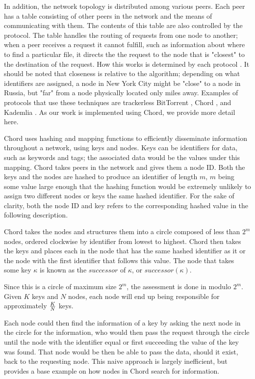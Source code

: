\documentclass[10pt, conference, compsocconf, letterpaper]{IEEEtran} %
\begin{document}
In addition, the network topology is distributed among various peers.  Each peer has a table consisting of other peers in the network and the means of communicating with them.  The contents of this table are also controlled by the protocol.  The table handles the routing of requests from one node to another; when a peer receives a request it cannot fulfill, such as information about where to find a particular file, it directs the the request to the node that is "closest" to the destination of the request. How this works is determined by each protocol \cite{Chord}.  It should be noted that closeness is relative to the algorithm; depending on what identifiers are assigned, a node in New York City might be "close" to a node in Russia, but "far" from a node physically located only miles away.  Examples of protocols that use these techniques are trackerless BitTorrent \cite{BitTorrent}, Chord \cite{Chord}, and Kademlia \cite{Kademlia}. As our work is implemented using Chord, we provide more detail here. 

Chord uses hashing and mapping functions to efficiently disseminate information throughout a network, using keys and nodes.  Keys can be identifiers for data, such as keywords and tags; the associated data would be the values under this mapping.  Chord takes peers in the network and gives them a node ID.  Both the keys and the nodes are hashed to produce an identifier of length $m$, $m$ being some value large enough that the hashing function would be extremely unlikely to assign two different nodes or keys the same hashed identifier.  For the sake of clarity, both the node ID and key refers to the corresponding hashed value in the following description.

Chord takes the nodes and structures them into a circle composed of less than $2^m$ nodes, ordered clockwise by identifier from lowest to highest.  Chord then takes the keys and places each in the node that has the same hashed identifier as it or the node with the first identifier that follows this value.  The node that takes some key $\kappa$ is known as the $successor$ of $\kappa$, or $successor(\kappa)$.  

Since this is a circle of maximum size $2^m$, the assessment is done in modulo $2^m$.  Given $K$ keys and $N$ nodes, each node will end up being responsible for approximately \(K\over N\) keys.

Each node could then find  the information of a key by asking the next node in the circle for the information, who would then pass the request through the circle until the node with the identifier equal or first succeeding the value of the key was found.  That node would be then be able to pass the data, should it exist, back to the requesting node.  This naive approach is largely inefficient, but provides a base example on how nodes in Chord search for information.
\end{document}
